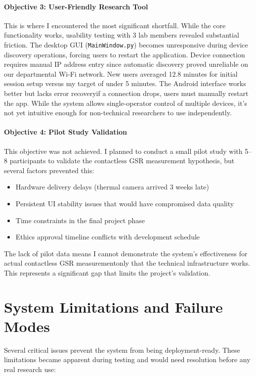 \paragraph{\textbf{Objective 3: User-Friendly Research Tool}} This is where I encountered the most significant
shortfall. While the core functionality works, usability testing with 3 lab members revealed substantial friction. The desktop GUI (\texttt{MainWindow.py}) becomes unresponsive during device discovery operations, forcing users to restart the application. Device connection requires manual IP address entry since automatic discovery proved unreliable on our departmental Wi-Fi network. New users averaged 12.8 minutes for initial session setup versus my target of under 5 minutes. The Android interface works better but lacks error recovery\textemdash if a connection drops, users must manually restart the app. While the system allows single-operator control of multiple devices, it's not yet intuitive enough for non-technical researchers to use independently.

\paragraph{\textbf{Objective 4: Pilot Study Validation}} This objective was not achieved. I planned to conduct a small pilot study with 5--8 participants to validate the contactless GSR measurement hypothesis, but several factors prevented this:
\begin{itemize}
    \item Hardware delivery delays (thermal camera arrived 3 weeks late)
    \item Persistent UI stability issues that would have compromised data quality
    \item Time constraints in the final project phase
    \item Ethics approval timeline conflicts with development schedule
\end{itemize}
The lack of pilot data means I cannot demonstrate the system's effectiveness for actual contactless GSR measurement\textemdash only that the technical infrastructure works. This represents a significant gap that limits the project's validation.


\section{System Limitations and Failure Modes}

Several critical issues prevent the system from being deployment-ready. These limitations became apparent during testing and would need resolution before any real research use:

